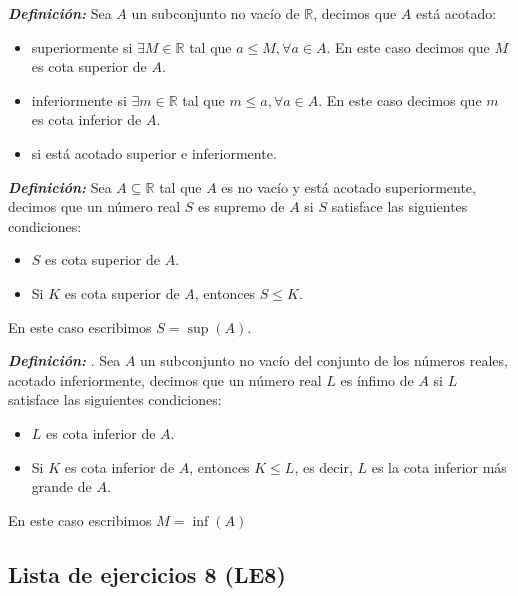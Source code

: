 \documentclass[11pt]{article}
\newcommand{\R}{\mathbb{R}}
\newcommand{\bfit}[1]{\textbf{\textit{#1}}}
\let\subset\subseteq
\begin{document}
\bfit{Definición:}  Sea $A$ un subconjunto no vacío de $\R$, decimos que $A$ está acotado:
\begin{itemize}
 \item superiormente si $\exists M\in \R$ tal que $a \leq M, \forall a\in A$. En este caso decimos que $M$ es cota superior de $A$.

 \item inferiormente si $\exists m\in \R$ tal que $m \leq a, \forall a\in A$. En este caso decimos que $m$ es cota inferior de $A$.

 \item si está acotado superior e inferiormente.
\end{itemize}

\bfit{Definición:}  Sea $A\subset \R$ tal que $A$ es no vacío y está acotado superiormente, decimos que un número real $S$ es supremo de $A$ si $S$ satisface las siguientes condiciones:
\begin{itemize}
 \item $S$ es cota superior de $A$.
 \item Si $K$ es cota superior de $A$, entonces $S\leq K$.%
\end{itemize}

En este caso escribimos $S=\sup(A)$.

\bfit{Definición:} . Sea $A$ un subconjunto no vacío del conjunto de los números reales, acotado inferiormente, decimos que un número real $L$ es ínfimo de $A$ si $L$ satisface las siguientes condiciones: \begin{itemize}
 \item $L$ es cota inferior de $A$.
 \item Si $K$ es cota inferior de $A$, entonces $K\leq L$, es decir, $L$ es la cota inferior más grande de $A$.
\end{itemize}

En este caso escribimos $M=\inf(A)$

\subsection*{Lista de ejercicios 8 (LE8)}
\end{document}
